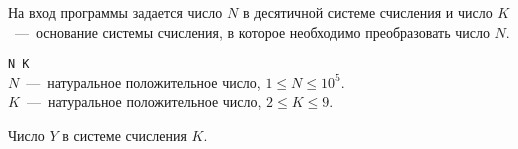На вход программы задается число $N$ в десятичной системе счисления и число $K$~---~основание системы счисления, в которое необходимо преобразовать число $N$.

\InputFile

\noindent
\texttt{N K} \\
$N$~---~натуральное положительное число, $1 \leq N \leq 10^5$. \\
$K$~---~натуральное положительное число, $2 \leq K \leq 9$.

\OutputFile

Число $Y$ в системе счисления $K$.

\SAMPLES

